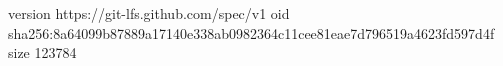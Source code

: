 version https://git-lfs.github.com/spec/v1
oid sha256:8a64099b87889a17140e338ab0982364c11cee81eae7d796519a4623fd597d4f
size 123784
